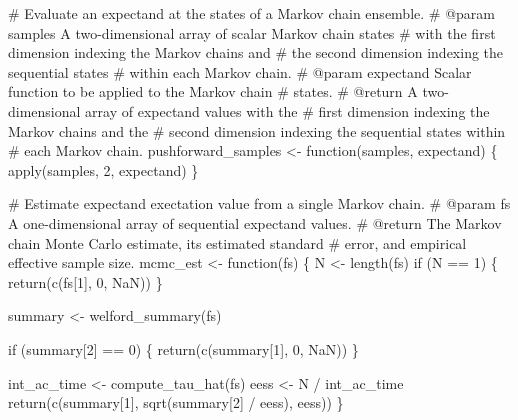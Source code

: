 \documentclass[
  letterpaper,
  DIV=11,
  numbers=noendperiod]{scrartcl}
\newenvironment{Shaded}{\begin{snugshade}}{\end{snugshade}}
\newcommand{\CommentTok}[1]{\textcolor[rgb]{0.37,0.37,0.37}{#1}}
\newcommand{\ConstantTok}[1]{\textcolor[rgb]{0.56,0.35,0.01}{#1}}
\newcommand{\ControlFlowTok}[1]{\textcolor[rgb]{0.00,0.23,0.31}{#1}}
\newcommand{\DecValTok}[1]{\textcolor[rgb]{0.68,0.00,0.00}{#1}}
\newcommand{\FunctionTok}[1]{\textcolor[rgb]{0.28,0.35,0.67}{#1}}
\newcommand{\NormalTok}[1]{\textcolor[rgb]{0.00,0.23,0.31}{#1}}
\newcommand{\OtherTok}[1]{\textcolor[rgb]{0.00,0.23,0.31}{#1}}
\newcommand{\SpecialCharTok}[1]{\textcolor[rgb]{0.37,0.37,0.37}{#1}}
\begin{document}
\begin{Shaded}
\begin{Highlighting}[]
\CommentTok{\# Evaluate an expectand at the states of a Markov chain ensemble.}
\CommentTok{\# @param samples A two{-}dimensional array of scalar Markov chain states }
\CommentTok{\#                with the first dimension indexing the Markov chains and }
\CommentTok{\#                the second dimension indexing the sequential states }
\CommentTok{\#                within each Markov chain.}
\CommentTok{\# @param expectand Scalar function to be applied to the Markov chain }
\CommentTok{\#                  states.}
\CommentTok{\# @return A two{-}dimensional array of expectand values with the }
\CommentTok{\#         first dimension indexing the Markov chains and the }
\CommentTok{\#         second dimension indexing the sequential states within }
\CommentTok{\#         each Markov chain.}
\NormalTok{pushforward\_samples }\OtherTok{\textless{}{-}} \ControlFlowTok{function}\NormalTok{(samples, expectand) \{}
  \FunctionTok{apply}\NormalTok{(samples, }\DecValTok{2}\NormalTok{, expectand)}
\NormalTok{\}}

\CommentTok{\# Estimate expectand exectation value from a single Markov chain.}
\CommentTok{\# @param fs A one{-}dimensional array of sequential expectand values.}
\CommentTok{\# @return The Markov chain Monte Carlo estimate, its estimated standard }
\CommentTok{\#         error, and empirical effective sample size.}
\NormalTok{mcmc\_est }\OtherTok{\textless{}{-}} \ControlFlowTok{function}\NormalTok{(fs) \{}
\NormalTok{  N }\OtherTok{\textless{}{-}} \FunctionTok{length}\NormalTok{(fs)}
  \ControlFlowTok{if}\NormalTok{ (N }\SpecialCharTok{==} \DecValTok{1}\NormalTok{) \{}
    \FunctionTok{return}\NormalTok{(}\FunctionTok{c}\NormalTok{(fs[}\DecValTok{1}\NormalTok{], }\DecValTok{0}\NormalTok{, }\ConstantTok{NaN}\NormalTok{))}
\NormalTok{  \}}

\NormalTok{  summary }\OtherTok{\textless{}{-}} \FunctionTok{welford\_summary}\NormalTok{(fs)}

  \ControlFlowTok{if}\NormalTok{ (summary[}\DecValTok{2}\NormalTok{] }\SpecialCharTok{==} \DecValTok{0}\NormalTok{) \{}
    \FunctionTok{return}\NormalTok{(}\FunctionTok{c}\NormalTok{(summary[}\DecValTok{1}\NormalTok{], }\DecValTok{0}\NormalTok{, }\ConstantTok{NaN}\NormalTok{))}
\NormalTok{  \}}

\NormalTok{  int\_ac\_time }\OtherTok{\textless{}{-}} \FunctionTok{compute\_tau\_hat}\NormalTok{(fs)}
\NormalTok{  eess }\OtherTok{\textless{}{-}}\NormalTok{ N }\SpecialCharTok{/}\NormalTok{ int\_ac\_time}
  \FunctionTok{return}\NormalTok{(}\FunctionTok{c}\NormalTok{(summary[}\DecValTok{1}\NormalTok{], }\FunctionTok{sqrt}\NormalTok{(summary[}\DecValTok{2}\NormalTok{] }\SpecialCharTok{/}\NormalTok{ eess), eess))}
\NormalTok{\}}


\end{Highlighting}
\end{Shaded}
\end{document}
